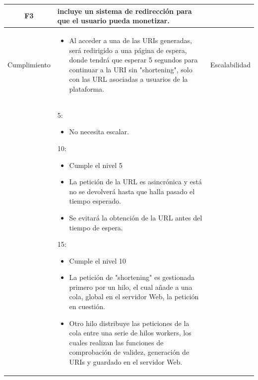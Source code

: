 \documentclass{article}
\begin{document}
 
\begin{table}[hbtp]
    \footnotesize
    \centering
    \settowidth{}
    \setlength\extrarowheight{5pt}
    \begin{tabulary}{\textwidth}{ C L }
        \textbf{F3} & incluye un sistema de redirección para que el usuario pueda monetizar.
        \\
    \hline
    
    Cumplimiento &
    \begin{itemize}
        
        \item Al acceder a una de las URIs generadas, será redirigido a una página de espera, donde tendrá que esperar 5 segundos para continuar a la URI sin "shortening", solo con las URL asociadas a usuarios de la plataforma.
        
    \end{itemize} &
        
    Escalabilidad\\ &
    5:
    \begin{itemize}
        \item No necesita escalar.
        
    \end{itemize} 
    10:
    \begin{itemize}
        \item Cumple el nivel 5
		
        \item La petición de la URL es asincrónica y está no se devolverá hasta que halla pasado el tiempo esperado.
        \item Se evitará la obtención de la URL antes del tiempo de espera.
        
    \end{itemize} 
    15:
    \begin{itemize}
        \item Cumple el nivel 10
        
        \item La petición de "shortening" es gestionada primero por un hilo, el cual añade a una cola, global en el servidor Web, la petición en cuestión.
        
        \item Otro hilo distribuye las peticiones de la cola entre una serie de hilos workers, los cuales realizan las funciones de comprobación de validez, generación de URIs y guardado en el servidor Web.
        

\end{itemize}
\end{tabulary}
\end{table}
\end{document}
